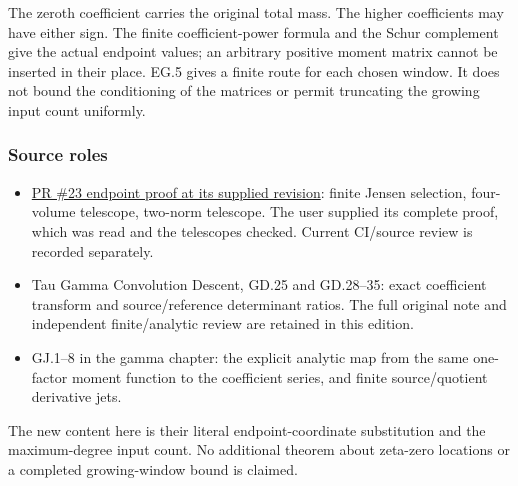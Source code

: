 The zeroth coefficient carries the original total mass. The higher coefficients may have either sign. The finite coefficient-power formula and the Schur complement give the actual endpoint values; an arbitrary positive moment matrix cannot be inserted in their place. EG.5 gives a finite route for each chosen window. It does not bound the conditioning of the matrices or permit truncating the growing input count uniformly.

\subsubsection{Source roles}\label{endpoint-eg_original--source-roles}

\begin{itemize}
\tightlist
\item
  \href{https://github.com/KokunoYumeto/zeta-function-research-reader/blob/c720f40530eed2f5969dbabe94dfd3fddc0f507f/workbenches/tau-toda-volume-formal/ENDPOINT_CRITERION.md}{PR \#23 endpoint proof at its supplied revision}: finite Jensen selection, four-volume telescope, two-norm telescope. The user supplied its complete proof, which was read and the telescopes checked. Current CI/source review is recorded separately.
\item
  Tau Gamma Convolution Descent, GD.25 and GD.28--35: exact coefficient transform and source/reference determinant ratios. The full original note and independent finite/analytic review are retained in this edition.
\item
  GJ.1--8 in the gamma chapter: the explicit analytic map from the same one-factor moment function to the coefficient series, and finite source/quotient derivative jets.
\end{itemize}

The new content here is their literal endpoint-coordinate substitution and the maximum-degree input count. No additional theorem about zeta-zero locations or a completed growing-window bound is claimed.
